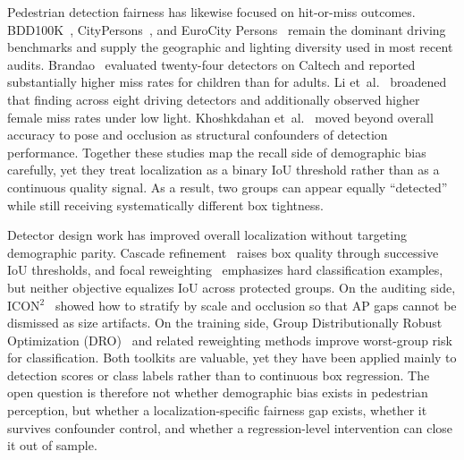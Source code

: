 \documentclass[runningheads]{llncs}
\begin{document}
Pedestrian detection fairness has likewise focused on hit-or-miss outcomes.
BDD100K~\cite{yu2020bdd100k}, CityPersons~\cite{zhang2017citypersons}, and
EuroCity Persons~\cite{braun2019eurocity} remain the dominant driving
benchmarks and supply the geographic and lighting diversity used in most recent
audits. Brandao~\cite{brandao2019age} evaluated twenty-four detectors on Caltech
and reported substantially higher miss rates for children than for adults.
Li et~al.~\cite{li2025bias} broadened that finding across eight driving
detectors and additionally observed higher female miss rates under low light.
Khoshkdahan et~al.~\cite{khoshkdahan2025pose} moved beyond overall accuracy to
pose and occlusion as structural confounders of detection performance. Together
these studies map the recall side of demographic bias carefully, yet they treat
localization as a binary IoU threshold rather than as a continuous quality
signal. As a result, two groups can appear equally ``detected'' while still
receiving systematically different box tightness.

Detector design work has improved overall localization without targeting
demographic parity. Cascade refinement~\cite{cai2021cascade} raises box quality
through successive IoU thresholds, and focal reweighting~\cite{lin2017focal}
emphasizes hard classification examples, but neither objective equalizes IoU
across protected groups. On the auditing side,
ICON$^2$~\cite{sudhakar2023icon2} showed how to stratify by scale and occlusion
so that AP gaps cannot be dismissed as size artifacts. On the training side,
Group Distributionally Robust Optimization
(DRO)~\cite{sagawa2020dro} and related reweighting methods improve worst-group
risk for classification. Both toolkits are valuable, yet they have been applied
mainly to detection scores or class labels rather than to continuous box
regression. The open question is therefore not whether demographic bias exists
in pedestrian perception, but whether a localization-specific fairness gap
exists, whether it survives confounder control, and whether a regression-level
intervention can close it out of sample.
\end{document}
